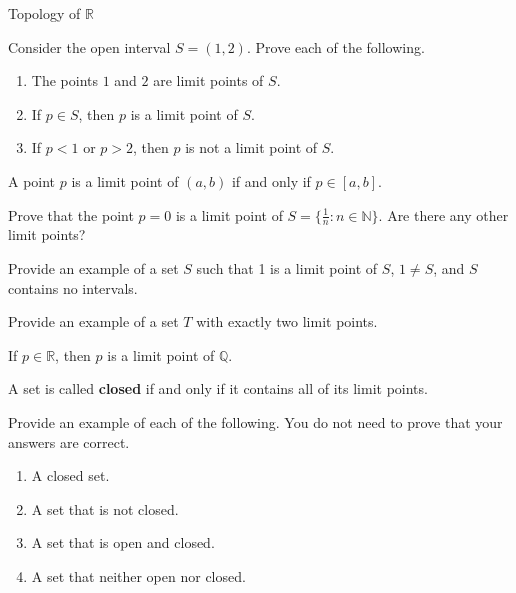 \begin{section}{Topology of $\mathbb{R}$}
\begin{problem}
Consider the open interval $S=(1,2)$. Prove each of the following.
\begin{enumerate}[label=\textrm{(\alph*)}]
\item The points $1$ and $2$ are limit points of $S$.
\item If $p\in S$, then $p$ is a limit point of $S$.
\item If $p<1$ or $p>2$, then $p$ is not a limit point of $S$.
\end{enumerate}
\end{problem}

\begin{theorem}
A point $p$ is a limit point of $(a,b)$ if and only if $p\in [a,b]$.
\end{theorem}

\begin{problem}
Prove that the point $p=0$ is a limit point of $S=\{\frac{1}{n}: n \in \mathbb{N}\}$.  Are there any other limit points?
\end{problem}

\begin{problem}
Provide an example of a set $S$ such that 1 is a limit point of $S$, $1\neq S$, and $S$ contains no intervals.
\end{problem}

\begin{problem}
Provide an example of a set $T$ with exactly two limit points.
\end{problem}

\begin{theorem}
If $p\in\mathbb{R}$, then $p$ is a limit point of $\mathbb{Q}$.
\end{theorem}

\begin{definition}
A set is called \textbf{closed} if and only if it contains all of its limit points.
\end{definition}

\begin{problem}
Provide an example of each of the following.  You do not need to prove that your answers are correct.
\begin{enumerate}[label=\textrm{(\alph*)}]
\item A closed set.
\item A set that is not closed.
\item A set that is open and closed.
\item A set that neither open nor closed.
\end{enumerate}


\end{problem}
\end{section}
